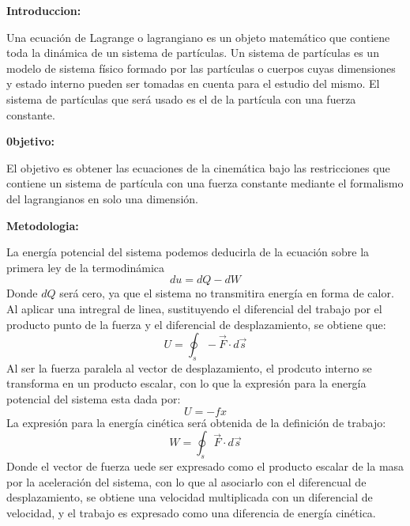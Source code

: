 \documentclass{article}
\begin{document}
\begin{multicols}{2}
\begin{center}
\textbf{
Introduccion:
}
\end{center}
\vspace*{-0.5cm}
Una ecuación de Lagrange o lagrangiano es un objeto matemático
que contiene toda la dinámica de un sistema de partículas.
Un sistema de partículas es un modelo de sistema físico formado
por las partículas o cuerpos cuyas dimensiones y estado interno
pueden ser tomadas en cuenta para el estudio del mismo. El sistema
de partículas que será usado es el de la partícula con una
fuerza constante.\\
\vspace*{-0.5cm}
\begin{center}
\textbf{
0bjetivo:
}
\end{center}
El objetivo es obtener las ecuaciones de la cinemática bajo las restricciones
que contiene un sistema de partícula con una fuerza
constante mediante el formalismo del lagrangianos en solo una dimensión.\\
\vspace*{-0.5cm}
\begin{center}
\textbf{
Metodologia:
}
\end{center}
La energía potencial del sistema podemos deducirla de la ecuación
sobre la primera ley de la termodinámica
\begin{equation}
du=dQ-dW
\end{equation}
Donde $dQ$ será cero, ya que el sistema no transmitira energía en forma de calor.\\
Al aplicar una intregral de linea, sustituyendo el diferencial del trabajo por el producto punto de la fuerza y el diferencial de desplazamiento, se obtiene que:
\begin{equation}
U= \oint_s -\vec{F} \cdot d\vec{s}
\end{equation}
Al ser la fuerza paralela al vector de desplazamiento, el prodcuto interno se transforma en un producto escalar, con lo que la expresión para la energía potencial del sistema esta dada por:
\begin{equation}
U= -fx
\end{equation}
La expresión para la energía cinética será obtenida de la definición de trabajo:
\begin{equation}
W= \oint_s \vec{F} \cdot d\vec{s}
\end{equation}
Donde el vector de fuerza uede ser expresado como el producto escalar de la masa por la aceleración del sistema, con lo que al asociarlo con el diferencual de desplazamiento, se obtiene una velocidad multiplicada con un diferencial de velocidad, y el trabajo es expresado como una diferencia de energía cinética.

\end{multicols}
\end{document}
